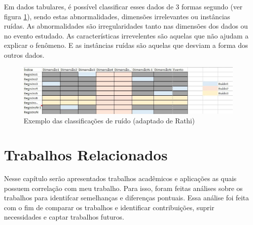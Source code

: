 \documentclass[
	12pt,				%
	openright,			%
	twoside,			%
	a4paper,			%
	english,			%
	brazil				%
	]{abntex2}
\begin{document}
			Em dados tabulares, é possível classificar esses dados de 3 formas segundo \cite{rathi_2019} (ver figura \ref{fig:Rathi}),
			sendo estas abnormalidades,
			dimensões irrelevantes ou
			instâncias ruídas. 
			As abnormalidades são irregularidades tanto nas dimensões dos dados ou no evento estudado.
			As características irrevelentes são aquelas que não ajudam a explicar o fenômeno.
			E as instâncias ruídas são aquelas que desviam a forma dos outros dados. \cite{rathi_2019}
			\begin{figure}[h!]
				\centering
				\includegraphics[width=\linewidth]{./figures/FundamentacaoTeorica/ExemploClassificacaoRuido.jpg}
				\caption{Exemplo das classificações de ruído (adaptado de Rathi)}
				\label{fig:Rathi}
			\end{figure}
			
\chapter{Trabalhos Relacionados}
	Nesse capítulo serão apresentados trabalhos acadêmicos e aplicações as quais possuem correlação com meu trabalho.
	Para isso, foram feitas análises sobre os trabalhos para identifcar semelhanças e diferenças pontuais.
	Essa análise foi feita com o fim de comparar os trabalhos e identificar contribuições, suprir necessidades e captar trabalhos futuros.
\end{document}
